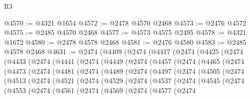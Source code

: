 \begin{lexlean}{R3}
\begin{coremodule}
@4570 := @4321 @1654
@4572 := @2478 @4570 @2468
@4573 := @2476 @4572
@4575 := @2485 @4570 @2468
@4577 := @4573 @4575 @2495
@4578 := @4321 @1672
@4580 := @2478 @4578 @2468
@4581 := @2476 @4580
@4583 := @2485 @4578 @2468
@4631 := @2474
    (@4409
      (@2474
        (@4417
          (@2474
            (@4425
              (@2474
                (@4433
                  (@2474
                    (@4441
                      (@2474
                        (@4449
                          (@2474
                            (@4457
                              (@2474
                                (@4465
                                  (@2474
                                    (@4473
                                      (@2474
                                        (@4481
                                          (@2474
                                            (@4489
                                              (@2474
                                                (@4497
                                                  (@2474
                                                    (@4505
                                                      (@2474
                                                        (@4513
                                                          (@2474
                                                            (@4521
                                                              (@2474
                                                                (@4529
                                                                  (@2474
                                                                    (@4537
                                                                      (@2474
                                                                        (@4545
                                                                          (@2474
                                                                            (@4553
                                                                              (@2474
                                                                                (@4561
                                                                                  (@2474
                                                                                    (@4569
                                                                                      (@2474
                                                                                        (@4577
                                                                                          (@2474

\end{coremodule}
\end{lexlean}
